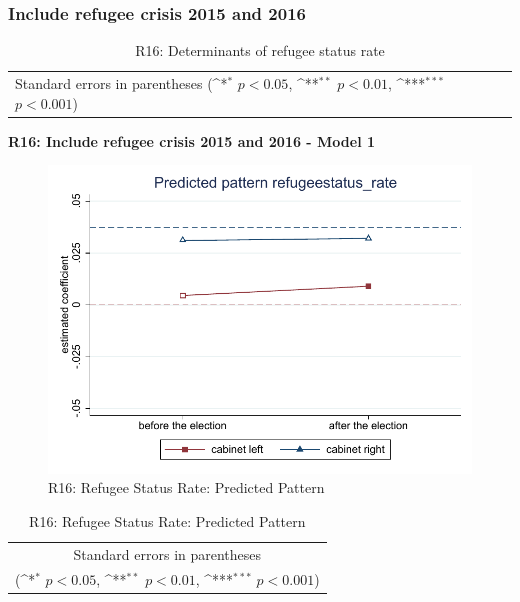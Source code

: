 \documentclass[10pt,a4paper]{scrartcl}
\begin{document}
\subsubsection{Include refugee crisis 2015 and 2016}
\begin{table}[!ht]\centering
	\renewcommand{\arraystretch}{1.25}
	\small
	\def\sym#1{\ifmmode^{#1}\else\(^{#1}\)\fi}
	\caption{R16: Determinants of refugee status rate}
	\begin{tabular}{l*{3}{c}}
		\hline\hline
		
		\hline\hline
		\multicolumn{4}{l}{\footnotesize Standard errors in parentheses (\sym{*} \(p<0.05\), \sym{**} \(p<0.01\), \sym{***} \(p<0.001\))}\\
	\end{tabular}
\end{table}

\clearpage
\textbf{R16: Include refugee crisis 2015 and 2016 - Model 1}
\begin{figure}[!ht]
	\centering
	\includegraphics[width=1\textwidth]{figures_edited/refugeestatus_rate_graph1_R16.pdf}
	\caption{R16: Refugee Status Rate: Predicted Pattern}
\end{figure}

\begin{table}[!ht]\centering
	\renewcommand{\arraystretch}{1.25}
	\def\sym#1{\ifmmode^{#1}\else\(^{#1}\)\fi}
	\caption{R16: Refugee Status Rate: Predicted Pattern}
	\begin{tabular}{l*{2}{c}}
		\hline\hline
		
		\hline\hline
		\multicolumn{3}{c}{\footnotesize Standard errors in parentheses} \\
		\multicolumn{3}{c}{\footnotesize (\sym{*} \(p<0.05\), \sym{**} \(p<0.01\), \sym{***} \(p<0.001\))}\\
	\end{tabular}
\end{table}
\end{document}
